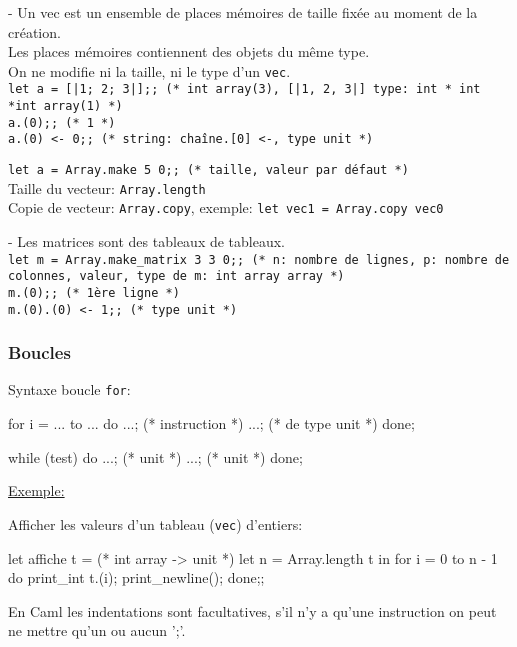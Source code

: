 \documentclass{article}
\newcommand{\code}[1]{\lstinline[style = mystyle]{#1}}
\begin{document}
			- Un vec est un ensemble de places mémoires de taille fixée au moment de la création.\\
			Les places mémoires contiennent des objets du même type.\\
			On ne modifie ni la taille, ni le type d'un \code{vec}.\\
			\code{let a = [|1; 2; 3|];; (* int array(3), [|1, 2, 3|] type: int * int *int array(1) *)}\\
			\code{a.(0);; (* 1 *)}\\
			\code{a.(0) <- 0;; (* string: chaîne.[0] <-, type unit *)}
			
			\code{let a = Array.make 5 0;; (* taille, valeur par défaut *)}\\
			Taille du vecteur: \code{Array.length}\\
			Copie de vecteur: \code{Array.copy}, exemple: \code{let vec1 = Array.copy vec0}
			
			- Les matrices sont des tableaux de tableaux.\\
			\code{let m = Array.make_matrix 3 3 0;; (* n: nombre de lignes, p: nombre de colonnes, valeur, type de m: int array array *)}\\
			\code{m.(0);; (* 1ère ligne *)}\\
			\code{m.(0).(0) <- 1;; (* type unit *)}
			
			\subsubsection{Boucles}
			
				Syntaxe boucle \code{for}:\\
				
				\begin{case}
for i = ... to ... do
	...; (* instruction *)
	...; (* de type unit *)
done;

while (test) do
	...; (* unit *)
	...; (* unit *)
done;
				\end{case}
				
				\underline{Exemple:}
				
				Afficher les valeurs d'un tableau (\code{vec}) d'entiers:
				
				\begin{case}
let affiche t = (* int array -> unit *)
	let n = Array.length t in
		for i = 0 to n - 1 do
			print_int t.(i);
			print_newline();
		done;;
				\end{case}
				
				En Caml les indentations sont facultatives, s'il n'y a qu'une instruction on peut ne mettre qu'un ou aucun ';'. %
				
\end{document}
